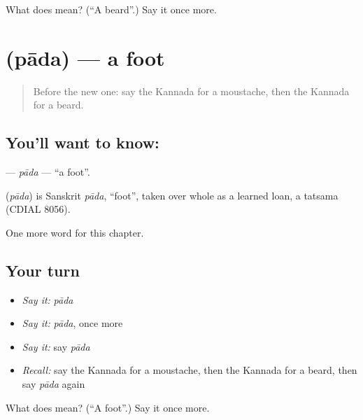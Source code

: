 \begin{tcolorbox}[breakable,colback=teal!4,colframe=teal!35!black,title={Before you move on}]
What does  mean? (\textquotedblleft{}A beard\textquotedblright{}.) Say it once more.
\end{tcolorbox}
\section[\texorpdfstring{\kn{ಪಾದ} (pāda)}{ಪಾದ (pāda)}]{ (pāda) — a foot}

\label{lesson:KA-C140-pada}



\begin{quote}
Before the new one: say the Kannada for a moustache, then the Kannada for a beard.
\end{quote}

\subsection*{You'll want to know: }
\textbf{} — \emph{pāda} — \textquotedblleft{}a foot\textquotedblright{}.

\begin{cousinweb}
\textbf{} (\emph{pāda}) is Sanskrit \emph{pāda}, \textquotedblleft{}foot\textquotedblright{}, taken over whole as a learned loan, a tatsama (CDIAL 8056).
\end{cousinweb}

\begin{grammarlens}[title={What you've built}]
One more word for this chapter.
\end{grammarlens}

\subsection*{Your turn}
\begin{itemize}
\raggedright
  \item \emph{Say it:} \emph{pāda}
  \item \emph{Say it:} \emph{pāda}, once more
  \item \emph{Say it:} say \emph{pāda}
  \item \emph{Recall:} say the Kannada for a moustache, then the Kannada for a beard, then say \emph{pāda} again
\end{itemize}

\begin{tcolorbox}[breakable,colback=teal!4,colframe=teal!35!black,title={Before you move on}]
What does  mean? (\textquotedblleft{}A foot\textquotedblright{}.) Say it once more.
\end{tcolorbox}
